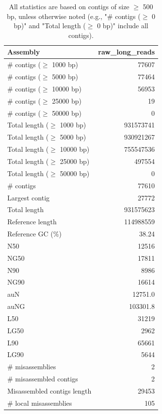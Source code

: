 \documentclass[12pt,a4paper]{article}
\begin{document}
\begin{table}[ht]
\begin{center}
\caption{All statistics are based on contigs of size $\geq$ 500 bp, unless otherwise noted (e.g., "\# contigs ($\geq$ 0 bp)" and "Total length ($\geq$ 0 bp)" include all contigs).}
\begin{tabular}{|l*{1}{|r}|}
\hline
Assembly & raw\_long\_reads \\ \hline
\# contigs ($\geq$ 1000 bp) & 77607 \\ \hline
\# contigs ($\geq$ 5000 bp) & 77464 \\ \hline
\# contigs ($\geq$ 10000 bp) & 56953 \\ \hline
\# contigs ($\geq$ 25000 bp) & 19 \\ \hline
\# contigs ($\geq$ 50000 bp) & 0 \\ \hline
Total length ($\geq$ 1000 bp) & 931573741 \\ \hline
Total length ($\geq$ 5000 bp) & 930921267 \\ \hline
Total length ($\geq$ 10000 bp) & 755547536 \\ \hline
Total length ($\geq$ 25000 bp) & 497554 \\ \hline
Total length ($\geq$ 50000 bp) & 0 \\ \hline
\# contigs & 77610 \\ \hline
Largest contig & 27772 \\ \hline
Total length & 931575623 \\ \hline
Reference length & 114988559 \\ \hline
Reference GC (\%) & 38.24 \\ \hline
N50 & 12516 \\ \hline
NG50 & 17811 \\ \hline
N90 & 8986 \\ \hline
NG90 & 16614 \\ \hline
auN & 12751.0 \\ \hline
auNG & 103301.8 \\ \hline
L50 & 31219 \\ \hline
LG50 & 2962 \\ \hline
L90 & 65661 \\ \hline
LG90 & 5644 \\ \hline
\# misassemblies & 2 \\ \hline
\# misassembled contigs & 2 \\ \hline
Misassembled contigs length & 29453 \\ \hline
\# local misassemblies & 105 \\ \hline

\end{tabular}
\end{center}
\end{table}
\end{document}
